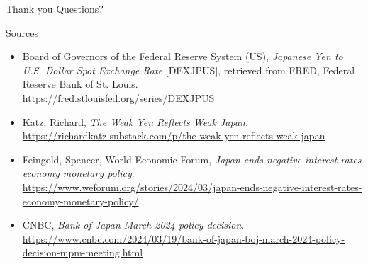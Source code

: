 \documentclass{beamer}
\begin{document}

\begin{frame}{Thank you}
\centering
\Large Questions?
\end{frame}


\appendix
{}

\begin{frame}[allowframebreaks]{Sources}
\small
\begin{itemize}
    \setlength{\itemsep}{0.8em}

    \item Board of Governors of the Federal Reserve System (US), \textit{Japanese Yen to U.S. Dollar Spot Exchange Rate} [DEXJPUS], retrieved from FRED, Federal Reserve Bank of St. Louis. \\
    \url{https://fred.stlouisfed.org/series/DEXJPUS}

    \item Katz, Richard, \textit{The Weak Yen Reflects Weak Japan}. \\
    \url{https://richardkatz.substack.com/p/the-weak-yen-reflects-weak-japan}

    \item Feingold, Spencer, World Economic Forum, \textit{Japan ends negative interest rates economy monetary policy}. \\
    \url{https://www.weforum.org/stories/2024/03/japan-ends-negative-interest-rates-economy-monetary-policy/}

    \item CNBC, \textit{Bank of Japan March 2024 policy decision}. \\
    \url{https://www.cnbc.com/2024/03/19/bank-of-japan-boj-march-2024-policy-decision-mpm-meeting.html}

\end{itemize}
\end{frame}
\end{document}
